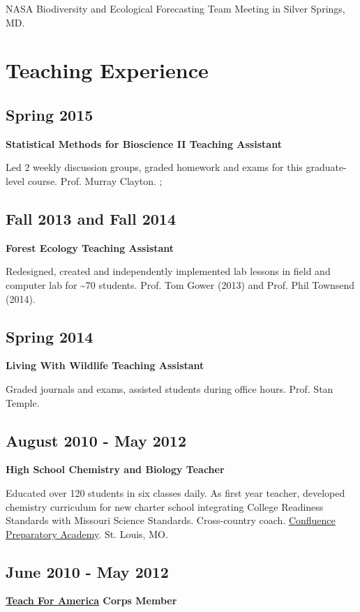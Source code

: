 \documentclass[11pt, sans]{moderncv}
\begin{document}
NASA Biodiversity and Ecological Forecasting Team Meeting in Silver Springs, MD.
\section*{Teaching Experience}
\label{sec:org780ee20}
\subsection*{Spring 2015}
\label{sec:orgadc2331}
\textbf{Statistical Methods for Bioscience II Teaching Assistant}

Led 2 weekly discussion groups, graded homework and exams for this
graduate-level course. Prof. Murray Clayton.
;
\subsection*{Fall 2013 and Fall 2014}
\label{sec:org5afdb77}
\textbf{Forest Ecology Teaching Assistant}

Redesigned, created and independently implemented lab lessons in field and computer lab for \textasciitilde{}70
students.  Prof. Tom Gower (2013) and Prof. Phil Townsend (2014).

\subsection*{Spring 2014}
\label{sec:org4be10c6}
\textbf{Living With Wildlife Teaching Assistant}

Graded journals and exams, assisted students during office hours.
Prof. Stan Temple.

\subsection*{August 2010 - May 2012}
\label{sec:org36ac48f}
\textbf{High School Chemistry and Biology Teacher}

Educated over 120 students in six classes daily. As first year
teacher, developed chemistry curriculum for new charter school
integrating College Readiness Standards with Missouri Science
Standards. Cross-country coach. \href{https://www.google.com/search?q=Confluence+Preparatory+Academy+St.+Louis\&oq=Confluence+Prep+Academy+St.+Louis\&aqs=chrome..69i57.7294j0j8\&sourceid=chrome\&ie=UTF-8\#q=Confluence+Prep+Academy+High+School+St.+Louis}{Confluence Preparatory Academy}. St. Louis, MO.

\subsection*{June 2010 - May 2012}
\label{sec:orgb2e15c3}
\textbf{\href{https://www.teachforamerica.org/}{Teach For America} Corps Member}
\end{document}
